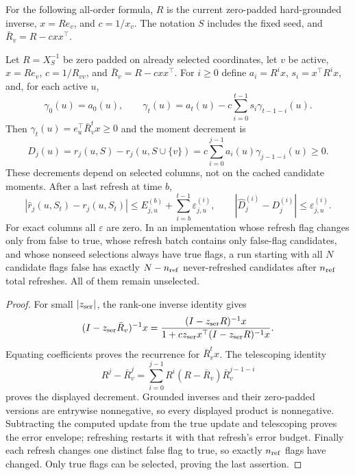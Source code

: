 For the following all-order formula, $R$ is the current zero-padded
hard-grounded inverse, $x=Re_v$, and $c=1/x_v$.
The notation $S$ includes the fixed seed, and $\bar R_v=R-cxx^\top$.
\begin{proposition}\label{prop:incall}
Let $R=X_S^{-1}$ be zero padded on already selected coordinates,
let $v$ be active, $x=Re_v$, $c=1/R_{vv}$, and
$\bar R_v=R-cxx^\top$. For $i\geq0$ define $a_i=R^ix$,
$s_i=x^\top R^ix$, and, for each active $u$,
\[
 \gamma_0(u)=a_0(u),\qquad
 \gamma_t(u)=a_t(u)-c\sum_{i=0}^{t-1}s_i\gamma_{t-1-i}(u).
\]
Then $\gamma_t(u)=e_u^\top \bar R_v^tx\geq0$ and the moment decrement is
\[
 D_j(u)=r_j(u,S)-r_j(u,S\cup\{v\})
      =c\sum_{i=0}^{j-1}a_i(u)\gamma_{j-1-i}(u)\geq0.
\]
These decrements depend on selected columns, not on the cached
candidate moments. After a last refresh at time $b$,
\[
 |\widehat r_j(u,S_t)-r_j(u,S_t)|
 \leq E_{j,u}^{(b)}+\sum_{i=b}^{t-1}\varepsilon_{j,u}^{(i)},
 \qquad
 |\widehat D_j^{(i)}-D_j^{(i)}|\leq\varepsilon_{j,u}^{(i)}.
\]
For exact columns all $\varepsilon$ are zero. In an implementation
whose refresh flag changes only from false to true, whose refresh
batch contains only false-flag candidates, and whose nonseed
selections always have true flags, a run starting with all $N$
candidate flags false has exactly $N-n_{\rm ref}$ never-refreshed candidates
after $n_{\rm ref}$ total refreshes. All of them remain unselected.
\end{proposition}
\begin{proof}
For small $|z_{\rm ser}|$, the rank-one inverse identity gives
\[
 (I-z_{\rm ser}\bar R_v)^{-1}x=
 \frac{(I-z_{\rm ser}R)^{-1}x}{1+c z_{\rm ser}x^\top(I-z_{\rm ser}R)^{-1}x}.
\]
Equating coefficients proves the recurrence for $\bar R_v^tx$.
The telescoping identity
\[
 R^j-\bar R_v^j=\sum_{i=0}^{j-1}R^i(R-\bar R_v)\bar R_v^{j-1-i}
\]
proves the displayed decrement. Grounded inverses and their zero-padded
versions are entrywise nonnegative, so every displayed product is
nonnegative. Subtracting the computed update from the true update
and telescoping proves the error envelope; refreshing restarts it
with that refresh's error budget. Finally each refresh changes one
distinct false flag to true, so exactly $n_{\rm ref}$ flags have changed.
Only true flags can be selected, proving the last assertion.
\end{proof}


